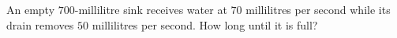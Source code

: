 An empty $700$-millilitre sink receives water at $70$ millilitres per second while its drain removes $50$ millilitres per second. How long until it is full?
